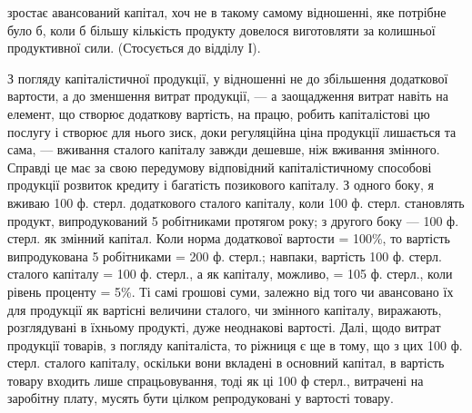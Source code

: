 зростає авансований капітал, хоч не в такому самому відношенні, яке потрібне
було б, коли б більшу кількість продукту довелося виготовляти за колишньої
продуктивної сили. (Стосується до відділу І).

З погляду капіталістичної продукції, у відношенні не до збільшення додаткової
вартости, а до зменшення витрат продукції, — а заощадження витрат
навіть на елемент, що створює додаткову вартість, на працю, робить капіталістові
цю послугу і створює для нього зиск, доки регуляційна ціна продукції
лишається та сама, — вживання сталого капіталу завжди дешевше, ніж
вживання змінного. Справді це має за свою передумову відповідний капіталістичному
способові продукції розвиток кредиту і багатість позикового капіталу. З одного
боку, я вживаю 100 ф. стерл. додаткового сталого капіталу, коли 100 ф.
стерл. становлять продукт, випродукований 5 робітниками протягом року; з
другого боку — 100 ф. стерл. як змінний капітал. Коли норма додаткової вартости
= 100\%, то вартість випродукована 5 робітниками = 200 ф. стерл.;
навпаки, вартість 100 ф. стерл. сталого капіталу = 100 ф. стерл., а як капіталу,
можливо, = 105 ф. стерл., коли рівень проценту = 5\%. Ті самі грошові суми,
залежно від того чи авансовано їх для продукції як вартісні величини сталого,
чи змінного капіталу, виражають, розглядувані в їхньому продукті, дуже неоднакові
вартості. Далі, щодо витрат продукції товарів, з погляду капіталіста,
то ріжниця є ще в тому, що з цих 100 ф. стерл. сталого капіталу, оскільки
вони вкладені в основний капітал, в вартість товару входить лише спрацьовування,
тоді як ці 100 ф стерл., витрачені на заробітну плату, мусять бути
цілком репродуковані у вартості товару.

